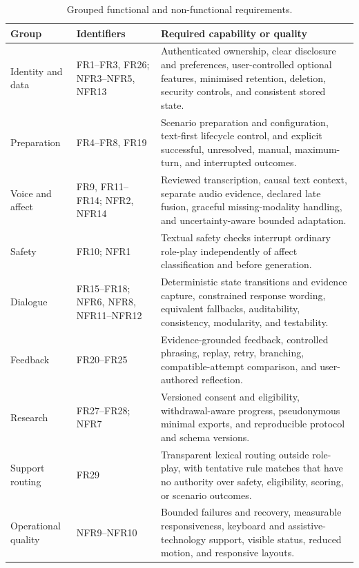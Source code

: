 \begin{table}[!t]
\centering
\caption{Grouped functional and non-functional requirements.}
\label{tab:grouped-requirements}
\footnotesize
\setlength{\tabcolsep}{3.5pt}
\begin{tabularx}{\textwidth}{|p{}|p{}|X|}
\hline
\textbf{Group} & \textbf{Identifiers} & \textbf{Required capability or quality} \\ \hline
Identity and data & FR1--FR3, FR26; NFR3--NFR5, NFR13 & Authenticated ownership, clear disclosure and preferences, user-controlled optional features, minimised retention, deletion, security controls, and consistent stored state. \\ \hline
Preparation & FR4--FR8, FR19 & Scenario preparation and configuration, text-first lifecycle control, and explicit successful, unresolved, manual, maximum-turn, and interrupted outcomes. \\ \hline
Voice and affect & FR9, FR11--FR14; NFR2, NFR14 & Reviewed transcription, causal text context, separate audio evidence, declared late fusion, graceful missing-modality handling, and uncertainty-aware bounded adaptation. \\ \hline
Safety & FR10; NFR1 & Textual safety checks interrupt ordinary role-play independently of affect classification and before generation. \\ \hline
Dialogue & FR15--FR18; NFR6, NFR8, NFR11--NFR12 & Deterministic state transitions and evidence capture, constrained response wording, equivalent fallbacks, auditability, consistency, modularity, and testability. \\ \hline
Feedback & FR20--FR25 & Evidence-grounded feedback, controlled phrasing, replay, retry, branching, compatible-attempt comparison, and user-authored reflection. \\ \hline
Research & FR27--FR28; NFR7 & Versioned consent and eligibility, withdrawal-aware progress, pseudonymous minimal exports, and reproducible protocol and schema versions. \\ \hline
Support routing & FR29 & Transparent lexical routing outside role-play, with tentative rule matches that have no authority over safety, eligibility, scoring, or scenario outcomes. \\ \hline
Operational quality & NFR9--NFR10 & Bounded failures and recovery, measurable responsiveness, keyboard and assistive-technology support, visible status, reduced motion, and responsive layouts. \\ \hline
\end{tabularx}
\end{table}

